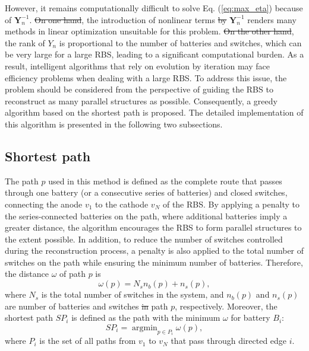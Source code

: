 \documentclass{article}
\providecommand{\DIFadd}[1]{{\protect\color{blue}\uwave{#1}}} %
\providecommand{\DIFdel}[1]{{\protect\color{red}\sout{#1}}}                      %
\providecommand{\DIFaddbegin}{} %
\providecommand{\DIFaddend}{} %
\providecommand{\DIFdelbegin}{} %
\providecommand{\DIFdelend}{} %
\newcommand{\DIFscaledelfig}{0.5}
\newlength{\DIFdelgraphicswidth} %
\newlength{\DIFdelgraphicsheight} %
\newcommand{\DIFaddincludegraphics}[2][]{{\color{blue}\fbox{\DIFOincludegraphics[#1]{#2}}}} %
\newcommand{\DIFdelincludegraphics}[2][]{%
\sbox{\DIFdelgraphicsbox}{\DIFOincludegraphics[#1]{#2}}%
\settoboxwidth{\DIFdelgraphicswidth}{\DIFdelgraphicsbox} %
\settoboxtotalheight{\DIFdelgraphicsheight}{\DIFdelgraphicsbox} %
\scalebox{\DIFscaledelfig}{%
\parbox[b]{\DIFdelgraphicswidth}{\usebox{\DIFdelgraphicsbox}\\[-\baselineskip] \rule{\DIFdelgraphicswidth}{0em}}\llap{\resizebox{\DIFdelgraphicswidth}{\DIFdelgraphicsheight}{%
\setlength{\unitlength}{\DIFdelgraphicswidth}%
\begin{picture}(1,1)%
\thicklines\linethickness{2pt} %
{\color[rgb]{1,0,0}\put(0,0){\framebox(1,1){}}}%
{\color[rgb]{1,0,0}\put(0,0){\line( 1,1){1}}}%
{\color[rgb]{1,0,0}\put(0,1){\line(1,-1){1}}}%
\end{picture}%
}\hspace*{3pt}}} %
} %
\DeclareRobustCommand{\DIFaddbegin}{\DIFOaddbegin \let\includegraphics\DIFaddincludegraphics} %
\DeclareRobustCommand{\DIFaddend}{\DIFOaddend \let\includegraphics\DIFOincludegraphics} %
\DeclareRobustCommand{\DIFdelbegin}{\DIFOdelbegin \let\includegraphics\DIFdelincludegraphics} %
\DeclareRobustCommand{\DIFdelend}{\DIFOaddend \let\includegraphics\DIFOincludegraphics} %
\begin{document}
However, it remains computationally difficult to solve Eq. (\ref{eq:max_eta}) because of $\bm{Y}_n^{-1}$.
\DIFdelbegin \DIFdel{On one hand}\DIFdelend \DIFaddbegin \DIFadd{Firstly}\DIFaddend , the introduction of nonlinear terms \DIFdelbegin \DIFdel{by }\DIFdelend \DIFaddbegin \DIFadd{through }\DIFaddend $\bm{Y}_n^{-1}$ renders many methods in linear optimization unsuitable for this problem.
\DIFdelbegin \DIFdel{On the other hand}\DIFdelend \DIFaddbegin \DIFadd{Secondly}\DIFaddend , the rank of $Y_{n}$ is proportional to the number of batteries and switches, which can be very large for a large RBS, leading to a significant computational burden.
As a result, intelligent algorithms that rely on evolution by iteration may face efficiency problems when dealing with a large RBS.
To address this issue, the problem should be considered from the perspective of guiding the RBS to reconstruct as many parallel structures as possible.
Consequently, a greedy algorithm based on the shortest path is proposed. 
The detailed implementation of this algorithm is presented in the following two subsections.

\subsection{Shortest path}

The path $p$ used in this method is defined as the complete route that passes through one battery (or a consecutive series of batteries) and closed switches, connecting the anode $v_1$ to the cathode $v_N$ of the RBS.
By applying a penalty to the series-connected batteries on the path, where additional batteries imply a greater distance, the algorithm encourages the RBS to form parallel structures to the \DIFaddbegin \DIFadd{maximum }\DIFaddend extent possible.
In addition, to reduce the number of switches controlled during the reconstruction process, a penalty is also applied to the total number of switches on the path while ensuring the minimum number of batteries.
Therefore, the distance $\omega$ of path $p$ is 
\begin{equation}\label{eq:weight}
    \omega(p) = N_s  n_b (p) + n_s (p),
\end{equation}
where $N_s$ is the total number of switches in the system, 
and $n_b(p)$ and $n_s(p)$ are \DIFaddbegin \DIFadd{the }\DIFaddend number of batteries and switches \DIFdelbegin \DIFdel{in }\DIFdelend \DIFaddbegin \DIFadd{along }\DIFaddend path $p$, respectively. 
Moreover, the shortest path $SP_i$ is defined as the path with the minimum $\omega$ for battery $B_i$:
\begin{equation}\label{eq:def_sp}
    SP_i = \mathop{\arg\min}_{p \in P_i} \omega(p),
\end{equation}
where $P_i$ is the set of all paths from $v_1$ to $v_N$ that pass through directed edge $i$.
\end{document}
